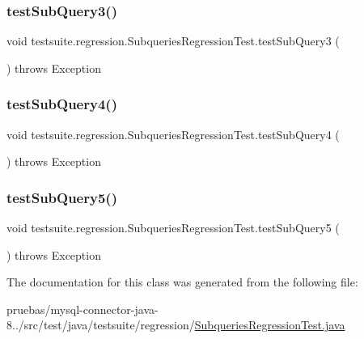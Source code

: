 \subsubsection{\texorpdfstring{test\+Sub\+Query3()}{testSubQuery3()}}
{\footnotesize\ttfamily void testsuite.\+regression.\+Subqueries\+Regression\+Test.\+test\+Sub\+Query3 (\begin{DoxyParamCaption}{ }\end{DoxyParamCaption}) throws Exception}

\mbox{\label{classtestsuite_1_1regression_1_1_subqueries_regression_test_af0e23e0f5d1f844361c630e8a9ac1b44}} 
\subsubsection{\texorpdfstring{test\+Sub\+Query4()}{testSubQuery4()}}
{\footnotesize\ttfamily void testsuite.\+regression.\+Subqueries\+Regression\+Test.\+test\+Sub\+Query4 (\begin{DoxyParamCaption}{ }\end{DoxyParamCaption}) throws Exception}

\mbox{\label{classtestsuite_1_1regression_1_1_subqueries_regression_test_a71c593651c44b20846642c5f2d6ea556}} 
\subsubsection{\texorpdfstring{test\+Sub\+Query5()}{testSubQuery5()}}
{\footnotesize\ttfamily void testsuite.\+regression.\+Subqueries\+Regression\+Test.\+test\+Sub\+Query5 (\begin{DoxyParamCaption}{ }\end{DoxyParamCaption}) throws Exception}



The documentation for this class was generated from the following file\+:\begin{DoxyCompactItemize}
\item 
pruebas/mysql-\/connector-\/java-\/8../src/test/java/testsuite/regression/\mbox{\hyperlink{_subqueries_regression_test_8java}{Subqueries\+Regression\+Test.\+java}}\end{DoxyCompactItemize}
